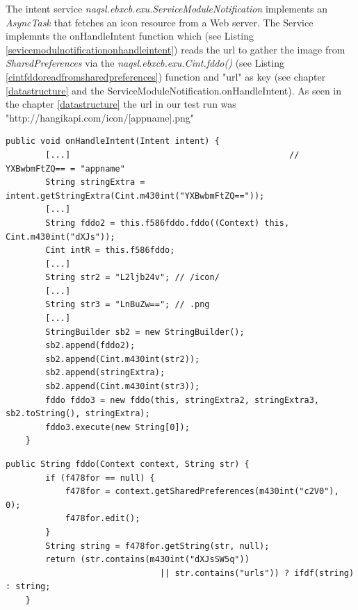 \documentclass[10pt,titlepage]{article}
\begin{document}
\newpage
The intent service \textit{naqsl.ebxcb.exu.ServiceModuleNotification} implements an \textit{AsyncTask} that fetches an icon resource from a Web server. The Service implemnts the onHandleIntent function which (see Listing \ref{sevicemodulnotificationonhandleintent}) reads the url to gather the image from \textit{SharedPreferences} via the \textit{naqsl.ebxcb.exu.Cint.fddo()} (see Listing \ref{cintfddoreadfromsharedpreferences}) function and "url" as key (see chapter \ref{datastructure} and the ServiceModuleNotification.onHandleIntent). As seen in the chapter \ref{datastructure} the url in our test run was "http://hangikapi.com/icon/[appname].png"

\begin{lstlisting}[label=sevicemodulnotificationonhandleintent,caption=\textit{naqsl.ebxcb.exu.ServiceModuleNotification.onHandleIntent()} collects necessary strings from the intent extras as well as the target url using the \textit{f586fddo.fddo()} (f586fddo is a member of type \textit{naqsl.ebxcb.exu.Cint}) function. Then it executes the Async task \textit{naqsl.ebxcb.exu.ServiceModuleNotification.fddo}.,frame=tb]
    public void onHandleIntent(Intent intent) {
        [...]                                            // YXBwbmFtZQ== = "appname"
        String stringExtra = intent.getStringExtra(Cint.m430int("YXBwbmFtZQ==")); 
        [...]
        String fddo2 = this.f586fddo.fddo((Context) this, Cint.m430int("dXJs"));
        Cint intR = this.f586fddo;
        [...]
        String str2 = "L2ljb24v"; // /icon/
        [...]
        String str3 = "LnBuZw=="; // .png
        [...]
        StringBuilder sb2 = new StringBuilder();
        sb2.append(fddo2);
        sb2.append(Cint.m430int(str2));
        sb2.append(stringExtra);
        sb2.append(Cint.m430int(str3));
        fddo fddo3 = new fddo(this, stringExtra2, stringExtra3, sb2.toString(), stringExtra);
        fddo3.execute(new String[0]);
    }
\end{lstlisting}

\begin{lstlisting}[label=cintfddoreadfromsharedpreferences,caption=The function textit{naqsl.ebxcb.exu.Cint.fddo()} reads the url of the Web resource from the shared preferences using the \textit{android.app.Context.getSharedPreferences} function.,frame=tb]
    public String fddo(Context context, String str) {
        if (f478for == null) {
            f478for = context.getSharedPreferences(m430int("c2V0"), 0);
            f478for.edit();
        }
        String string = f478for.getString(str, null);
        return (str.contains(m430int("dXJsSW5q")) 
                               || str.contains("urls")) ? ifdf(string) : string;
    }
\end{lstlisting}
\end{document}
